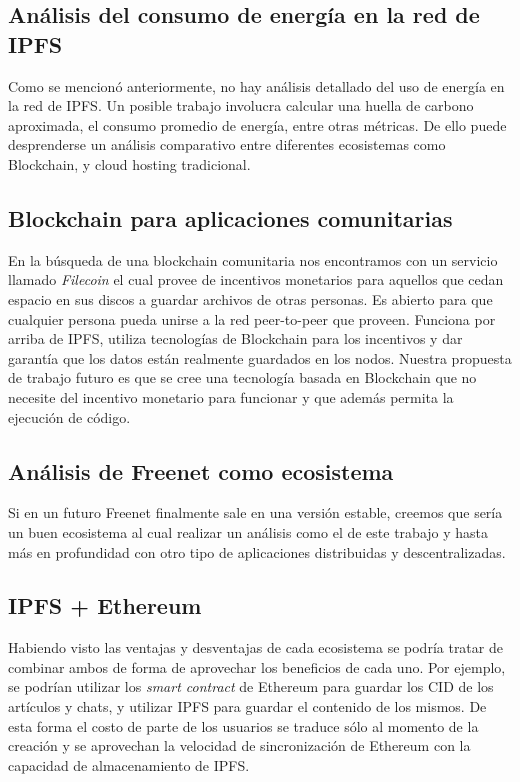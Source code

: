 \subsection{Análisis del consumo de energía en la red de IPFS}

Como se mencionó anteriormente, no hay análisis detallado del uso de energía en la red de IPFS. Un posible trabajo involucra calcular una huella de carbono aproximada, el consumo promedio de energía, entre otras métricas. De ello puede desprenderse un análisis comparativo entre diferentes ecosistemas como Blockchain, y cloud hosting tradicional.

\subsection{Blockchain para aplicaciones comunitarias}

En la búsqueda de una blockchain comunitaria nos encontramos con un servicio llamado \textit{Filecoin} \cite{filecoin} el cual provee de incentivos monetarios para aquellos que cedan espacio en sus discos a guardar archivos de otras personas. Es abierto para que cualquier persona pueda unirse a la red peer-to-peer que proveen. Funciona por arriba de IPFS, utiliza tecnologías de Blockchain para los incentivos y dar garantía que los datos están realmente guardados en los nodos. Nuestra propuesta de trabajo futuro es que se cree una tecnología basada en Blockchain que no necesite del incentivo monetario para funcionar y que además permita la ejecución de código.

\subsection{Análisis de Freenet como ecosistema}

Si en un futuro Freenet finalmente sale en una versión estable, creemos que sería un buen ecosistema al cual realizar un análisis como el de este trabajo y hasta más en profundidad con otro tipo de aplicaciones distribuidas y descentralizadas.

\subsection{IPFS + Ethereum}

Habiendo visto las ventajas y desventajas de cada ecosistema se podría tratar de combinar ambos de forma de aprovechar los beneficios de cada uno. Por ejemplo, se podrían utilizar los \textit{smart contract} de Ethereum para guardar los CID de los artículos y chats, y utilizar IPFS para guardar el contenido de los mismos. De esta forma el costo de parte de los usuarios se traduce sólo al momento de la creación y se aprovechan la velocidad de sincronización de Ethereum con la capacidad de almacenamiento de IPFS.
